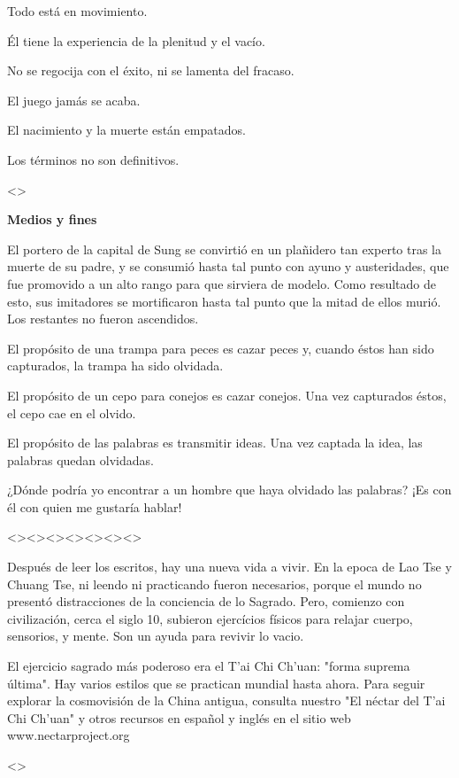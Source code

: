 Todo está en movimiento.

Él tiene la experiencia de la plenitud y el vacío.

No se regocija con el éxito, ni se lamenta del fracaso.

El juego jamás se acaba.

El nacimiento y la muerte están empatados.

Los términos no son definitivos.

\textless\textgreater{}

\textbf{{Medios y fines}}

El portero de la capital de Sung se convirtió en un plañidero tan
experto tras la muerte de su padre, y se consumió hasta tal punto con
ayuno y austeridades, que fue promovido a un alto rango para que
sirviera de modelo. Como resultado de esto, sus imitadores se
mortificaron hasta tal punto que la mitad de ellos murió. Los restantes
no fueron ascendidos.

El propósito de una trampa para peces es cazar peces y, cuando éstos han
sido capturados, la trampa ha sido olvidada.

El propósito de un cepo para conejos es cazar conejos. Una vez
capturados éstos, el cepo cae en el olvido.

El propósito de las palabras es transmitir ideas. Una vez captada la
idea, las palabras quedan olvidadas.

¿Dónde podría yo encontrar a un hombre que haya olvidado las palabras?
¡Es con él con quien me gustaría hablar!

\textless\textgreater\textless\textgreater\textless\textgreater\textless\textgreater\textless\textgreater\textless\textgreater\textless\textgreater{}

Después de leer los escritos, hay una nueva vida a vivir. En la epoca de
Lao Tse y Chuang Tse, ni leendo ni practicando fueron necesarios, porque
el mundo no presentó distracciones de la conciencia de lo Sagrado. Pero,
comienzo con civilización, cerca el siglo 10, subieron ejercícios
físicos para relajar cuerpo, sensorios, y mente. Son un ayuda para
revivir lo vacio.

El ejercicio sagrado más poderoso era el T'ai Chi Ch'uan: "forma suprema
última". Hay varios estilos que se practican mundial hasta ahora. Para
seguir explorar la cosmovisión de la China antigua, consulta nuestro "El
néctar del T'ai Chi Ch'uan" y otros recursos en español y inglés en el
sitio web www.nectarproject.org

\textless\textgreater{}
